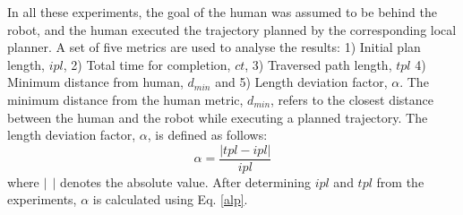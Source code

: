 In all these experiments, the goal of the human was assumed to be behind the robot, and the human executed the trajectory planned by the corresponding local planner. A set of five metrics are used to analyse the results: 1) Initial plan length, $ipl$, 2) Total time for completion, $ct$, 3) Traversed path length, $tpl$ 4) Minimum distance from human, $d_{min}$ and 5) Length deviation factor, $\alpha$. The minimum distance from the human metric, $d_{min}$, refers to the closest distance between the human and the robot while executing a planned trajectory. The length deviation factor, $\alpha$, is defined as follows:
\begin{equation}
    \alpha = \frac{|tpl - ipl|}{ipl}
    \label{alp}
\end{equation}
where $|\ \ |$ denotes the absolute value. After determining $ipl$ and $tpl$ from the experiments, $\alpha$ is calculated using Eq. \eqref{alp}.
